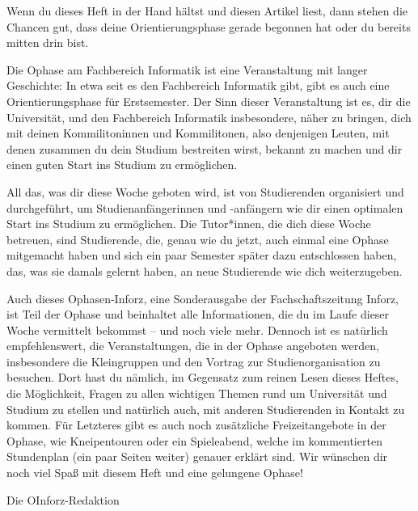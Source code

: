 {Wenn du dieses Heft in der Hand hältst und diesen Artikel liest, dann stehen die Chancen gut, dass deine Orientierungsphase gerade begonnen hat oder du bereits mitten drin bist.}
{
Die Ophase am Fachbereich Informatik ist eine Veranstaltung mit langer Geschichte: In etwa seit es den Fachbereich Informatik gibt, gibt es auch eine Orientierungsphase für Erstsemester. Der Sinn dieser Veranstaltung ist es, dir die Universität, und den Fachbereich Informatik insbesondere, näher zu bringen, dich mit deinen Kommilitoninnen und Kommilitonen, also denjenigen Leuten, mit denen zusammen du dein Studium bestreiten wirst, bekannt zu machen und dir einen guten Start ins Studium zu ermöglichen.

All das, was dir diese Woche geboten wird, ist von Studierenden organisiert und durchgeführt, um Studienanfängerinnen und -anfängern wie dir einen optimalen Start ins Studium zu ermöglichen. Die Tutor*innen, die dich diese Woche betreuen, sind Studierende, die, genau wie du jetzt, auch einmal eine Ophase mitgemacht haben und sich ein paar Semester später dazu entschlossen haben, das, was sie damals gelernt haben, an neue Studierende wie dich weiterzugeben.

Auch dieses Ophasen-Inforz, eine Sonderausgabe der Fachschaftszeitung Inforz, ist Teil der Ophase und beinhaltet alle Informationen, die du im Laufe dieser Woche vermittelt bekommst – und noch viele mehr. Dennoch ist es natürlich empfehlenswert, die Veranstaltungen, die in der Ophase angeboten werden, insbesondere die Kleingruppen und den Vortrag zur Studienorganisation zu besuchen. Dort hast du nämlich, im Gegensatz zum reinen Lesen dieses Heftes, die Möglichkeit, Fragen zu allen wichtigen Themen rund um Universität und Studium zu stellen und natürlich auch, mit anderen Studierenden in Kontakt zu kommen. Für Letzteres gibt es auch noch zusätzliche Freizeitangebote in der Ophase, wie Kneipentouren oder ein Spieleabend, welche im kommentierten Stundenplan (ein paar Seiten weiter) genauer erklärt sind.
Wir wünschen dir noch viel Spaß mit diesem Heft und eine gelungene Ophase!
}
{Die OInforz-Redaktion}

\vspace{37mm}

\newpage

